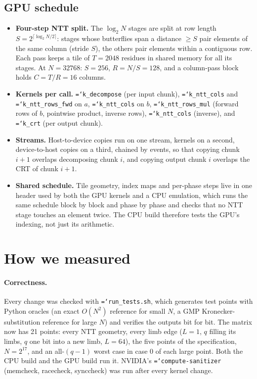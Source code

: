 \documentclass[11pt,a4paper]{article}
\newcommand{\code}[1]{\texttt{\hyphenchar\font=`\-\relax #1}}
\begin{document}
\subsection{GPU schedule}
\begin{itemize}[leftmargin=*]
\item \textbf{Four-step NTT split.} The $\log_2 N$ stages are split at row length
  $S = 2^{\lceil \log_2 N / 2 \rceil}$: stages whose butterflies span a distance
  $\ge S$ pair elements of the same column (stride $S$), the others pair elements
  within a contiguous row. Each pass keeps a tile of $T = 2048$ residues in shared
  memory for all its stages. At $N = 32768$: $S = 256$, $R = N/S = 128$, and a
  column-pass block holds $C = T/R = 16$ columns.
\item \textbf{Kernels per call.} \code{k\_decompose} (per input chunk),
  \code{k\_ntt\_cols} and \code{k\_ntt\_rows\_fwd} on $a$, \code{k\_ntt\_cols} on $b$,
  \code{k\_ntt\_rows\_mul} (forward rows of $b$, pointwise product, inverse rows),
  \code{k\_ntt\_cols} (inverse), and \code{k\_crt} (per output chunk).
\item \textbf{Streams.} Host-to-device copies run on one stream, kernels on a
  second, device-to-host copies on a third, chained by events, so that copying
  chunk $i+1$ overlaps decomposing chunk $i$, and copying output chunk $i$ overlaps
  the CRT of chunk $i+1$.
\item \textbf{Shared schedule.} Tile geometry, index maps and per-phase steps live in
  one header used by both the GPU kernels and a CPU emulation, which runs the same
  schedule block by block and phase by phase and checks that no NTT stage touches
  an element twice. The CPU build therefore tests the GPU's indexing, not just its
  arithmetic.
\end{itemize}

\section{How we measured}

\paragraph{Correctness.} Every change was checked with \code{run\_tests.sh}, which
generates test points with Python oracles (an exact $O(N^2)$ reference for small $N$,
a GMP Kronecker-substitution reference for large $N$) and verifies the outputs
bit for bit. The matrix now has 21 points: every NTT geometry, every limb edge
($L = 1$, $q$ filling its limbs, $q$ one bit into a new limb, $L = 64$), the five
points of the specification, $N = 2^{17}$, and an all-$(q-1)$ worst case in
case 0 of each large point. Both the CPU build and the GPU build run it. NVIDIA's
\code{compute-sanitizer} (memcheck, racecheck, synccheck) was run after every
kernel change.
\end{document}
